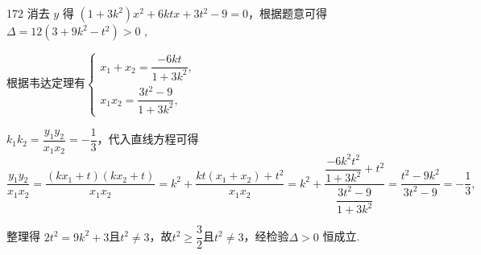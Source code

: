 \begin{enumerate}
\begin{jieda}
\begin{enumerate}
\begin{enumerate}
\begin{dingautolist}{172}
                    消去 $y$ 得 $\left( {1 + 3{k}^{2}}\right) {x}^{2} + {6ktx} + 3{t}^{2} - 9 = 0$，根据题意可得$\Delta  = {12}\left( {3 + 9{k}^{2} - {t}^{2}}\right)  > 0$ ,
                    
                    根据韦达定理有$\left\{  {\begin{array}{l} {x}_{1} + {x}_{2} = \dfrac{-{6kt}}{1 + 3{k}^{2}}, \\  {x}_{1}{x}_{2} = \dfrac{3{t}^{2} - 9}{1 + 3{k}^{2}}, \end{array}}\right.$
                    
                    ${k}_{1}{k}_{2} = \dfrac{{y}_{1}{y}_{2}}{{x}_{1}{x}_{2}} =  - \dfrac{1}{3}$，代入直线方程可得$\dfrac{{y}_{1}{y}_{2}}{{x}_{1}{x}_{2}} = \dfrac{\left( {k{x}_{1} + t}\right) \left( {k{x}_{2} + t}\right) }{{x}_{1}{x}_{2}} = {k}^{2} + \dfrac{{kt}\left( {{x}_{1} + {x}_{2}}\right)  + {t}^{2}}{{x}_{1}{x}_{2}} = {k}^{2} + \dfrac{\dfrac{-6{k}^{2}{t}^{2}}{1 + 3{k}^{2}} + {t}^{2}}{\dfrac{3{t}^{2} - 9}{1 + 3{k}^{2}}} = \dfrac{{t}^{2} - 9{k}^{2}}{3{t}^{2} - 9} =  - \dfrac{1}{3},$
                    
                    整理得 $2{t}^{2} = 9{k}^{2} + 3$且$t^2 \neq 3$，故${t}^{2} \geq \dfrac{3}{2}$且$t^2 \neq 3$，经检验$\Delta  > 0$ 恒成立.
                    

\end{dingautolist}
\end{enumerate}
\end{enumerate}
\end{jieda}
\end{enumerate}
